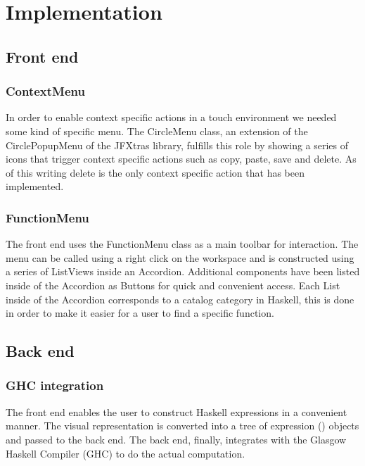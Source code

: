 \chapter{Implementation}
\label{chap:implementation}

\section{Front end}

\subsection{ContextMenu}

In order to enable context specific actions in a touch environment we needed some kind of specific menu.
The CircleMenu class, an extension of the CirclePopupMenu of the JFXtras library, fulfills this role by showing a series of icons that trigger context specific actions such as copy, paste, save and delete.
As of this writing delete is the only context specific action that has been implemented.

\subsection{FunctionMenu}

The front end uses the FunctionMenu class as a main toolbar for interaction.
The menu can be called using a right click on the workspace and is constructed using a series of ListViews inside an Accordion.
Additional components have been listed inside of the Accordion as Buttons for quick and convenient access.
Each List inside of the Accordion corresponds to a catalog category in Haskell, this is done in order to make it easier for a user
to find a specific function.

\section{Back end}

\subsection{GHC integration}

The front end enables the user to construct Haskell expressions in a convenient manner.
The visual representation is converted into a tree of expression () objects and passed to the back end. 
The back end, finally, integrates with the Glasgow Haskell Compiler (\gls{GHC}) to do the actual computation.

